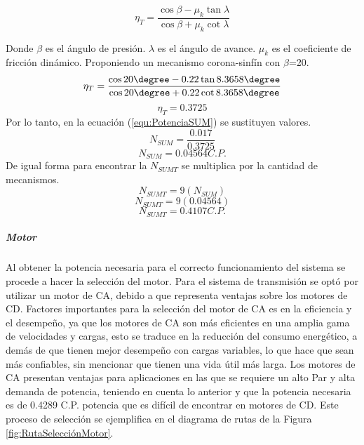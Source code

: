 \begin{equation}
    \eta_T=\frac{\cos{\beta}-\mu_k\tan{\lambda}}{\cos{\beta}+\mu_k\cot{\lambda}}
\end{equation}

Donde\hfill\break
$\beta$ es el ángulo de presión.\hfill\break
$\lambda$ es el ángulo de avance.\hfill\break
$\mu_k$ es el coeficiente de fricción dinámico.\hfill\break
Proponiendo un mecanismo corona-sinfín con $\beta$=20\degree.
\begin{equation*}
    \eta_T=\frac{\cos{20\degree}-0.22\tan{8.3658\degree}}{\cos{20\degree}+0.22\cot{8.3658\degree}}
\end{equation*}
\begin{equation*}
    \eta_T=0.3725
\end{equation*}
Por lo tanto, en la ecuación (\ref{equ:PotenciaSUM}) se sustituyen valores.
\begin{equation*}
    N_{SUM}=\frac{0.017}{0.3725}
\end{equation*}
\begin{equation*}
    N_{SUM}=0.04564 C.P.
\end{equation*}
De igual forma para encontrar la $N_{SUMT}$ se multiplica por la cantidad de mecanismos.
\begin{equation*}
    N_{SUMT}=9(N_{SUM}) 
\end{equation*}
\begin{equation*}
    N_{SUMT}=9(0.04564) 
\end{equation*}
\begin{equation*}
    N_{SUMT}=0.4107 C.P. 
\end{equation*}
\subparagraph{Motor}\hfill \break
Al obtener la potencia necesaria para el correcto funcionamiento del sistema se procede a hacer la selección del motor.
Para el sistema de transmisión se optó por utilizar un motor de CA, debido a que representa ventajas sobre los motores de CD.
Factores importantes para la selección del motor de CA es en la eficiencia y el desempeño, ya que los motores de CA son más eficientes en una amplia gama de velocidades y cargas, esto se traduce en la reducción del consumo energético, a demás de que tienen mejor desempeño con cargas variables, lo que hace que sean más confiables, sin mencionar que tienen una vida útil más larga.\cite{MotoresElectricos} \hfill\break
Los motores de CA presentan ventajas para aplicaciones en las que se requiere un alto Par y alta demanda de potencia, teniendo en cuenta lo anterior y que la potencia necesaria es de 0.4289 C.P. potencia que es difícil de encontrar en motores de CD. Este proceso de selección se ejemplifica en el diagrama de rutas de la Figura \ref{fig:RutaSelecciónMotor}.
